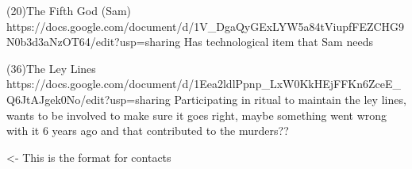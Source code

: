 \documentclass[char]{GL2020}
\begin{document}
(20)The Fifth God (Sam)
https://docs.google.com/document/d/1V_DgaQyGExLYW5a84tViupfFEZCHG9N0b3d3aNzOT64/edit?usp=sharing
Has technological item that Sam needs

(36)The Ley Lines
https://docs.google.com/document/d/1Eea2ldlPpnp_LxW0KkHEjFFKn6ZceE_Q6JtAJgek0No/edit?usp=sharing
Participating in ritual to maintain the ley lines, wants to be involved to make sure it goes right, maybe something went wrong with it 6 years ago and that contributed to the murders??

\begin{itemz}[Goals]
	\item 
\end{itemz}

\begin{itemz}[Notes]
	\item 
\end{itemz}

\begin{contacts}
	\contact{\cTest{}} <- This is the format for contacts 
\end{contacts}
\end{document}
